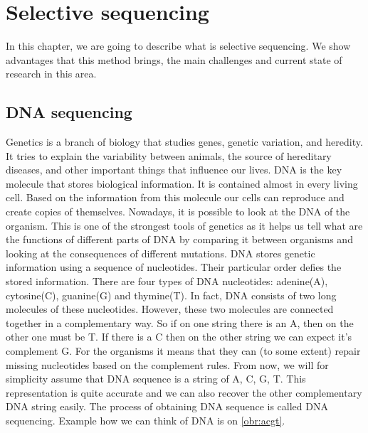 \chapter{Selective sequencing}

\label{kap:selSeq} %

In this chapter, we are going to describe what is selective sequencing. We
show advantages that this method brings, the main challenges and current state of
research in this area.

\section{DNA sequencing}

Genetics is a branch of biology that studies genes, genetic variation, and heredity.
It tries to explain the variability between animals, the source of hereditary diseases, and
other important things that influence our lives. DNA is the key molecule
that stores biological information. It is contained almost in every living cell. Based
on the information from this molecule our cells can reproduce and create copies of
themselves. Nowadays, it is possible to look at the DNA of the organism. This is
one of the strongest tools of genetics as it helps us tell what are the functions
of different parts of DNA by comparing it between organisms and looking at the
consequences of different mutations. DNA stores genetic information using a sequence of
nucleotides. Their particular order defies the stored information. There are four types of DNA nucleotides:
adenine(A), cytosine(C), guanine(G) and thymine(T). In fact, DNA consists of two long
molecules of these nucleotides. However, these two molecules are connected together
in a complementary way. So if on one string there is an A, then on the other
one must be T. If there is a C then on the other string we can expect
it's complement G. For the organisms it means that they can (to some extent) repair
missing nucleotides based on the complement rules. From now, we will for simplicity
assume that DNA sequence is a string of A, C, G, T. This representation is quite accurate
and we can also recover the other complementary DNA string easily. The process of obtaining DNA
sequence is called DNA sequencing. Example how we can think of DNA is on \ref{obr:acgt}.


